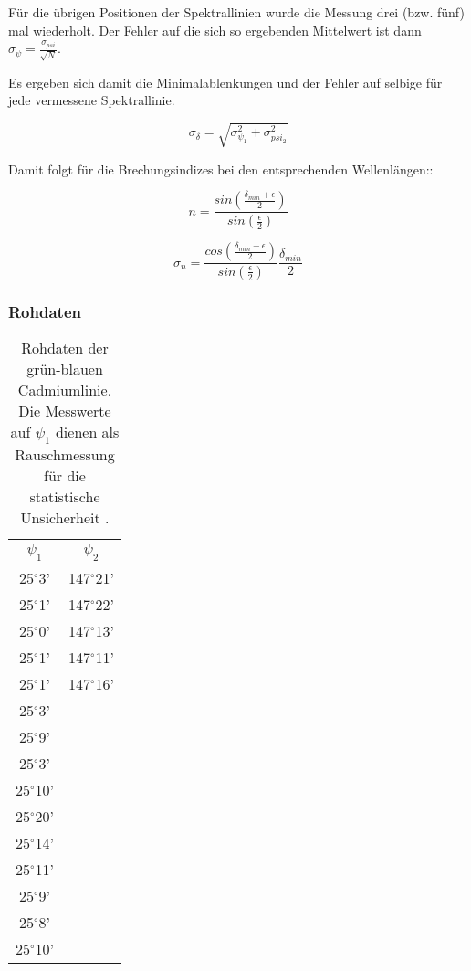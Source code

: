 \documentclass[12pt,a4paper]{article}
\begin{document}
Für die übrigen Positionen der Spektrallinien wurde die Messung drei (bzw. fünf) mal wiederholt. Der Fehler auf die sich so ergebenden Mittelwert ist dann $\sigma_{\psi}=\frac{\sigma_{psi}}{\sqrt{N}}$.

Es ergeben sich damit die Minimalablenkungen und der Fehler auf selbige für jede vermessene Spektrallinie.

\begin{equation}
\sigma_{\delta} = \sqrt{\sigma_{\psi_1}^2+\sigma_{psi_2}^2}
\end{equation}

Damit folgt für die Brechungsindizes bei den entsprechenden Wellenlängen::

\begin{equation}
n = \frac{sin(\frac{\delta_{min}+\epsilon}{2})}{sin(\frac{\epsilon}{2})}
\end{equation}

\begin{equation}
\sigma_n = \frac{cos(\frac{\delta_{min}+\epsilon}{2})}{sin(\frac{\epsilon}{2})} \frac{\delta_{min}}{2}
\end{equation}

\subsubsection{Rohdaten}

\begin{table}
\begin{tabular}{|c|c|}
\hline 
$\psi_1$ & $\psi_2$ \\ 
\hline 
25$^{\circ}$3' & 147$^{\circ}$21' \\ 
\hline 
25$^{\circ}$1' & 147$^{\circ}$22' \\ 
\hline 
25$^{\circ}$0'& 147$^{\circ}$13' \\ 
\hline 
25$^{\circ}$1' & 147$^{\circ}$11' \\ 
\hline 
25$^{\circ}$1' & 147$^{\circ}$16' \\ 
\hline 
25$^{\circ}$3' & \\ 
\hline 
25$^{\circ}$9' & \\ 
\hline 
25$^{\circ}$3' & \\ 
\hline 
25$^{\circ}$10' & \\ 
\hline 
25$^{\circ}$20' & \\ 
\hline 
25$^{\circ}$14' & \\ 
\hline 
25$^{\circ}$11' & \\ 
\hline 
25$^{\circ}$9' & \\ 
\hline 
25$^{\circ}$8' & \\ 
\hline 
25$^{\circ}$10' & \\ 
\hline 
\end{tabular} 
\label{tab:RauschenPrisma}
\caption{Rohdaten der grün-blauen Cadmiumlinie. Die Messwerte auf $\psi_1$ dienen als Rauschmessung für die statistische Unsicherheit .}
\end{table}
\end{document}
